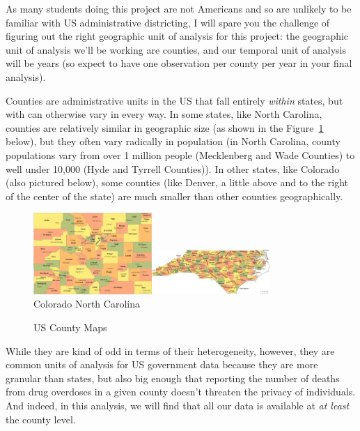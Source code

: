 \documentclass[12pt]{article}
\begin{document}
As many students doing this project are not Americans and so are unlikely to be familiar with US administrative districting, I will spare you the challenge of figuring out the right geographic unit of analysis for this project: the geographic unit of analysis we'll be working are counties, and our temporal unit of analysis will be years (so expect to have one observation per county per year in your final analysis).

Counties are administrative units in the US that fall entirely \emph{within} states, but with can otherwise vary in every way. In some states, like North Carolina, counties are relatively similar in geographic size (as shown in the Figure~\ref{counties} below), but they often vary radically in population (in North Carolina, county populations vary from over 1 million people (Mecklenberg and Wade Counties) to well under 10,000 (Hyde and Tyrrell Counties)). In other states, like Colorado (also pictured below), some counties (like Denver, a little above and to the right of the center of the state) are much smaller than other counties geographically.

\begin{figure}[h!]
  \centering
  \caption{US County Maps}\label{counties}
  \includegraphics[width=0.4\textwidth]{images/CO_counties.jpg}\includegraphics[width=0.4\textwidth]{images/NC_counties.jpg}\\
  \scriptsize{Colorado \hspace*{5cm} North Carolina}
\end{figure}

While they are kind of odd in terms of their heterogeneity, however, they are common units of analysis for US government data because they are more granular than states, but also big enough that reporting the number of deaths from drug overdoses in a given county doesn't threaten the privacy of individuals. And indeed, in this analysis, we will find that all our data is available at \emph{at least} the county level.
\end{document}
